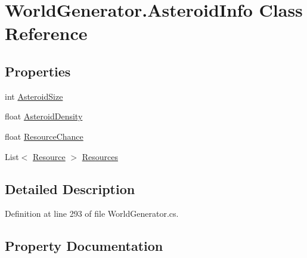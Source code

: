\hypertarget{class_world_generator_1_1_asteroid_info}{}\section{World\+Generator.\+Asteroid\+Info Class Reference}
\label{class_world_generator_1_1_asteroid_info}
\subsection*{Properties}
\begin{DoxyCompactItemize}
\item 
int \hyperlink{class_world_generator_1_1_asteroid_info_ae04e6b897cce7fda4d3a0ba3df42e0f7}{Asteroid\+Size}
\item 
float \hyperlink{class_world_generator_1_1_asteroid_info_ae112eeb1cb1960faca1124cf1895d1ce}{Asteroid\+Density}
\item 
float \hyperlink{class_world_generator_1_1_asteroid_info_afb2d516be342a62d43d762ee3538abfc}{Resource\+Chance}
\item 
List$<$ \hyperlink{class_world_generator_1_1_resource}{Resource} $>$ \hyperlink{class_world_generator_1_1_asteroid_info_afa0eacc7af337429b80210f3074f7c37}{Resources}
\end{DoxyCompactItemize}


\subsection{Detailed Description}


Definition at line 293 of file World\+Generator.\+cs.



\subsection{Property Documentation}
\mbox{\label{class_world_generator_1_1_asteroid_info_ae112eeb1cb1960faca1124cf1895d1ce}} 
